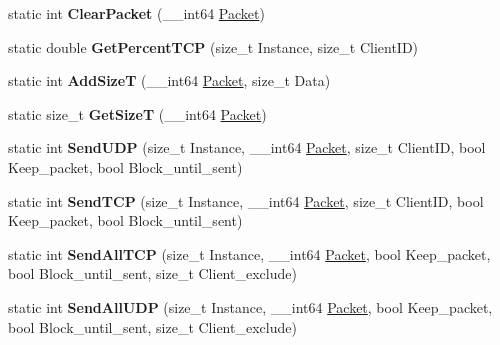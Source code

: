 \begin{DoxyCompactItemize}
\item 
\hypertarget{structmn_c_l_r_ab29a1c01ad34fd981d648d5803e3f0eb}{
static int {\bfseries ClearPacket} (\_\-\_\-int64 \hyperlink{class_packet}{Packet})}
\label{structmn_c_l_r_ab29a1c01ad34fd981d648d5803e3f0eb}

\item 
\hypertarget{structmn_c_l_r_abc16d63d429593c758af827299205170}{
static double {\bfseries GetPercentTCP} (size\_\-t Instance, size\_\-t ClientID)}
\label{structmn_c_l_r_abc16d63d429593c758af827299205170}

\item 
\hypertarget{structmn_c_l_r_a84d0c994b8e2c3d903a08934fd29edde}{
static int {\bfseries AddSizeT} (\_\-\_\-int64 \hyperlink{class_packet}{Packet}, size\_\-t Data)}
\label{structmn_c_l_r_a84d0c994b8e2c3d903a08934fd29edde}

\item 
\hypertarget{structmn_c_l_r_a315fa3017e79d5e2911a79ab47314d4e}{
static size\_\-t {\bfseries GetSizeT} (\_\-\_\-int64 \hyperlink{class_packet}{Packet})}
\label{structmn_c_l_r_a315fa3017e79d5e2911a79ab47314d4e}

\item 
\hypertarget{structmn_c_l_r_a22057b2ae8e7e946890a9aaff160b4e5}{
static int {\bfseries SendUDP} (size\_\-t Instance, \_\-\_\-int64 \hyperlink{class_packet}{Packet}, size\_\-t ClientID, bool Keep\_\-packet, bool Block\_\-until\_\-sent)}
\label{structmn_c_l_r_a22057b2ae8e7e946890a9aaff160b4e5}

\item 
\hypertarget{structmn_c_l_r_a0620a3dd56744816ca5eea802e9a813d}{
static int {\bfseries SendTCP} (size\_\-t Instance, \_\-\_\-int64 \hyperlink{class_packet}{Packet}, size\_\-t ClientID, bool Keep\_\-packet, bool Block\_\-until\_\-sent)}
\label{structmn_c_l_r_a0620a3dd56744816ca5eea802e9a813d}

\item 
\hypertarget{structmn_c_l_r_ab9fed2ed1fb8c95983d882356bf0e13f}{
static int {\bfseries SendAllTCP} (size\_\-t Instance, \_\-\_\-int64 \hyperlink{class_packet}{Packet}, bool Keep\_\-packet, bool Block\_\-until\_\-sent, size\_\-t Client\_\-exclude)}
\label{structmn_c_l_r_ab9fed2ed1fb8c95983d882356bf0e13f}

\item 
\hypertarget{structmn_c_l_r_ab704c3d9cc3cd8977031dd6146f0ef77}{
static int {\bfseries SendAllUDP} (size\_\-t Instance, \_\-\_\-int64 \hyperlink{class_packet}{Packet}, bool Keep\_\-packet, bool Block\_\-until\_\-sent, size\_\-t Client\_\-exclude)}
\label{structmn_c_l_r_ab704c3d9cc3cd8977031dd6146f0ef77}


\end{DoxyCompactItemize}
